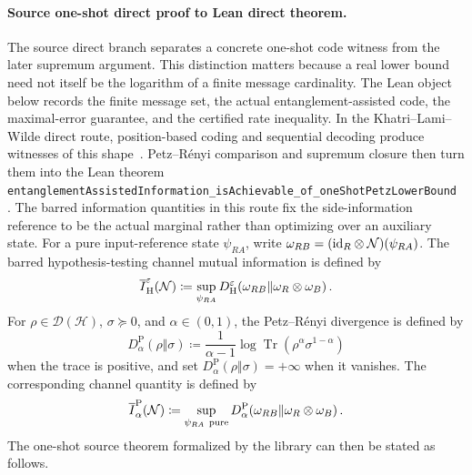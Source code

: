 \documentclass[10pt,a4paper]{article}
\begin{document}
\paragraph{Source one-shot direct proof to Lean direct theorem.}
The source direct branch separates a concrete one-shot code witness from the
later supremum argument.  This distinction matters because a real lower bound
need not itself be the logarithm of a finite message cardinality.  The Lean
object below records the finite message set, the actual entanglement-assisted
code, the maximal-error guarantee, and the certified rate inequality.  In the
Khatri--Lami--Wilde direct route, position-based coding and sequential decoding
produce witnesses of this shape~\cite{AnshuJainWarsi2019,QiWangWilde2018,OskoueiManciniWilde2019,KhatriLamiWilde2025Principles}.
Petz--R\'enyi comparison and supremum closure then turn them into the Lean theorem
\texttt{entanglementAssistedInformation\_isAchievable\_of\_oneShotPetzLowerBound}~\cite{DattaHsieh2011,AnshuJainWarsi2019,QiWangWilde2018,OskoueiManciniWilde2019,KhatriLamiWilde2025Principles}.
The barred information quantities in this route fix the side-information
reference to be the actual marginal rather than optimizing over an auxiliary
state.  For a pure input-reference state $\psi_{RA}$, write
$\omega_{RB}=({\operatorname{id}}_R\otimes{\cal N})(\psi_{RA})$.  The barred
hypothesis-testing channel mutual information is defined by
\begin{equation}
    \overline I_{\mathrm H}^{\varepsilon}({\cal N})
    \coloneqq
    \sup_{\psi_{RA}}
    D_{\mathrm H}^{\varepsilon}
    \!\left(\omega_{RB}\middle\|\omega_R\otimes\omega_B\right).
\end{equation}
For $\rho\in\mathcal D(\mathcal H)$, $\sigma\succeq0$, and
$\alpha\in(0,1)$, the Petz--R\'enyi divergence is defined by
\begin{equation}
D_\alpha^{\mathrm P}(\rho\Vert\sigma)
\coloneqq \frac{1}{\alpha-1}
\log\operatorname{Tr}(\rho^\alpha\sigma^{1-\alpha})
\end{equation}
when the trace is positive, and set
\(D_\alpha^{\mathrm P}(\rho\Vert\sigma)=+\infty\) when it vanishes.
The corresponding channel quantity is defined by
\begin{equation}
    \overline I_{\alpha}^{\mathrm P}({\cal N})
    \coloneqq \sup_{\psi_{RA}\ {\rm pure}}
    D_{\alpha}^{\mathrm P}
    \!\left(\omega_{RB}\middle\|\omega_R\otimes\omega_B\right).
\end{equation}
The one-shot source theorem formalized by the library can then be stated as
follows.
	
\end{document}
